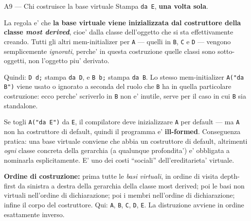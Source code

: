 \documentclass{report}
\newcommand{\code}[1]{\texttt{\small #1}}
\begin{document}
\begin{soluzione}{A9 --- Chi costruisce la base virtuale}
\label{sol:A9}
Stampa \code{da E}, \textbf{una volta sola}.

La regola e' che \textbf{la base virtuale viene inizializzata dal costruttore
della classe \emph{most derived}}, cioe' dalla classe dell'oggetto che si sta
effettivamente creando. Tutti gli altri mem-initializer per \code{A} ---
quelli in \code{B}, \code{C} e \code{D} --- vengono semplicemente
\emph{ignorati}, perche' in questa costruzione quelle classi sono sotto-oggetti,
non l'oggetto piu' derivato.

Quindi: \code{D d;} stampa \code{da D}, e \code{B b;} stampa \code{da B}. Lo
stesso mem-initializer \code{A("da B")} viene usato o ignorato a seconda del
ruolo che \code{B} ha in quella particolare costruzione: ecco perche' scriverlo
in \code{B} non e' inutile, serve per il caso in cui \code{B} sia standalone.

Se togli \code{A("da E")} da \code{E}, il compilatore deve inizializzare
\code{A} per default --- ma \code{A} non ha costruttore di default, quindi il
programma e' \textbf{ill-formed}. Conseguenza pratica: una base virtuale
conviene che abbia un costruttore di default, altrimenti \emph{ogni} classe
concreta della gerarchia (a qualunque profondita') e' obbligata a nominarla
esplicitamente. E' uno dei costi ``sociali'' dell'ereditarieta' virtuale.

\textbf{Ordine di costruzione:} prima tutte le \emph{basi virtuali}, in ordine
di visita depth-first da sinistra a destra della gerarchia della classe most
derived; poi le basi non virtuali nell'ordine di dichiarazione; poi i membri
nell'ordine di dichiarazione; infine il corpo del costruttore. Qui:
\code{A}, \code{B}, \code{C}, \code{D}, \code{E}. La distruzione avviene in
ordine esattamente inverso.
\end{soluzione}
\end{document}

